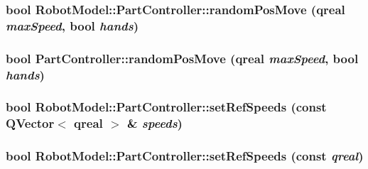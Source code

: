 \label{class_robot_model_1_1_part_controller_aeb2bca8add9b083ebd19d0d2d07fdfd4}
\hypertarget{class_robot_model_1_1_part_controller_aa7dfbc575182f6eeb56c4190ea0e50f7}{
\subsubsection[{randomPosMove}]{\setlength{\rightskip}{0pt plus 5cm}bool RobotModel::PartController::randomPosMove (qreal {\em maxSpeed}, \/  bool {\em hands})}}
\label{class_robot_model_1_1_part_controller_aa7dfbc575182f6eeb56c4190ea0e50f7}
\hypertarget{class_robot_model_1_1_part_controller_af513e2aa6934bcfeef7d2bf73e9b3cc3}{
\subsubsection[{randomPosMove}]{\setlength{\rightskip}{0pt plus 5cm}bool PartController::randomPosMove (qreal {\em maxSpeed}, \/  bool {\em hands})}}
\label{class_robot_model_1_1_part_controller_af513e2aa6934bcfeef7d2bf73e9b3cc3}
\hypertarget{class_robot_model_1_1_part_controller_a5481c9f2cbbd8370fd2e5b62c38c7d2f}{
\subsubsection[{setRefSpeeds}]{\setlength{\rightskip}{0pt plus 5cm}bool RobotModel::PartController::setRefSpeeds (const QVector$<$ qreal $>$ \& {\em speeds})}}
\label{class_robot_model_1_1_part_controller_a5481c9f2cbbd8370fd2e5b62c38c7d2f}
\hypertarget{class_robot_model_1_1_part_controller_a8fda7fd0b7914ec93b349b0b11f8d757}{
\subsubsection[{setRefSpeeds}]{\setlength{\rightskip}{0pt plus 5cm}bool RobotModel::PartController::setRefSpeeds (const  {\em qreal})}}
